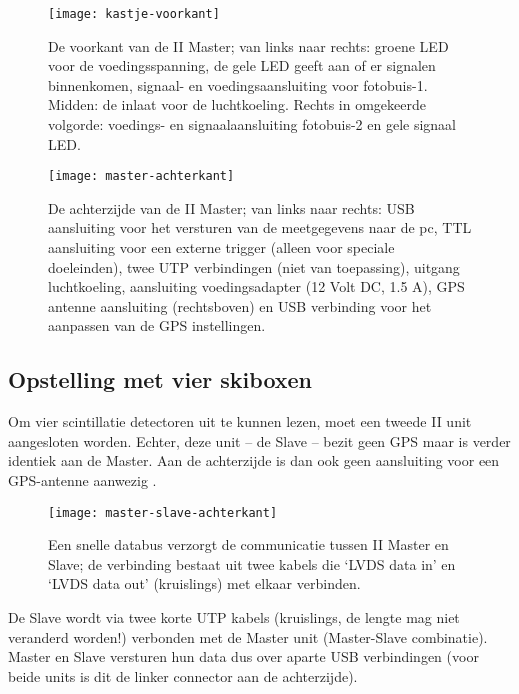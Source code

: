 \begin{figure}
    \centering
    \texttt{[image: kastje-voorkant]}
    \caption{De voorkant van de \hisparc II Master; van links naar
    rechts: groene LED voor de voedingsspanning, de gele LED geeft aan
    of er signalen binnenkomen, signaal- en voedingsaansluiting voor
    fotobuis-1. Midden: de inlaat voor de luchtkoeling. Rechts in
    omgekeerde volgorde: voedings- en signaalaansluiting fotobuis-2 en
    gele signaal LED.}
    \label{fig:kastje-voorkant}
\end{figure}

\begin{figure}
    \centering
    \texttt{[image: master-achterkant]}
    \caption{De achterzijde van de \hisparc II Master; van links naar
    rechts: USB aansluiting voor het versturen van de meetgegevens naar
    de pc, TTL aansluiting voor een externe trigger (alleen voor
    speciale doeleinden), twee UTP verbindingen (niet van toepassing),
    uitgang luchtkoeling, aansluiting voedingsadapter (12 Volt DC, 1.5
    A), GPS antenne aansluiting (rechtsboven) en USB verbinding voor het
    aanpassen van de GPS instellingen.}
    \label{fig:master-achterkant}
\end{figure}

\subsection{Opstelling met vier skiboxen}

Om vier scintillatie detectoren uit te kunnen lezen, moet een tweede
\hisparc II unit aangesloten worden. Echter, deze unit – de Slave –
 bezit geen GPS maar is verder identiek aan de
Master. Aan de achterzijde is dan ook geen aansluiting voor een
GPS-antenne aanwezig . 

\begin{figure}
    \centering
    \texttt{[image: master-slave-achterkant]}
    \caption{Een snelle databus verzorgt de communicatie tussen \hisparc
    II Master en Slave; de verbinding bestaat uit twee kabels die ‘LVDS
    data in’ en ‘LVDS data out’ (kruislings) met elkaar verbinden.}
    \label{fig:master-slave-achterkant}
\end{figure}

De Slave wordt via twee korte UTP kabels (kruislings, de lengte mag niet
veranderd worden!) verbonden met de Master unit (Master-Slave
combinatie). Master en Slave versturen hun data dus over aparte USB
verbindingen (voor beide units is dit de linker connector aan de
achterzijde). 


